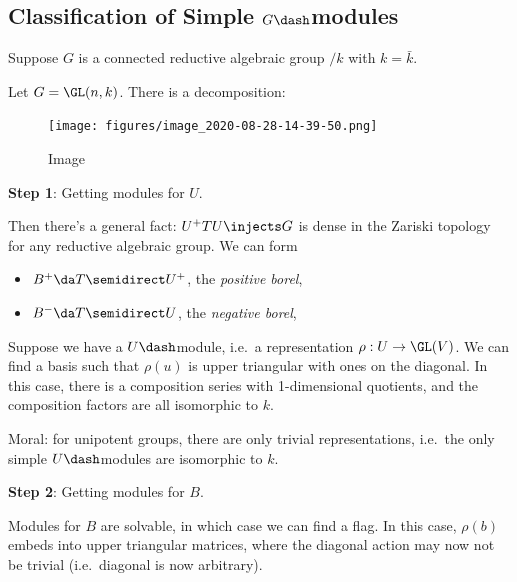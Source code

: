 
\hypertarget{classification-of-simple-gdashmodules}{%
\subsection{\texorpdfstring{Classification of Simple
\(G\dash\)modules}{Classification of Simple G\textbackslash dashmodules}}\label{classification-of-simple-gdashmodules}}

Suppose \(G\) is a connected reductive algebraic group \(/k\) with
\(k = \bar k\).

\begin{example}

Let \(G = \GL(n, k)\). There is a decomposition:

\begin{figure}
\centering
\texttt{[image: figures/image\_2020-08-28-14-39-50.png]}
\caption{Image}
\end{figure}

\end{example}

\textbf{Step 1}: Getting modules for \(U\).

Then there's a general fact: \(U^+ T U \injects G\) is dense in the
Zariski topology for any reductive algebraic group. We can form

\begin{itemize}
\tightlist
\item
  \(B^+ \da T\semidirect U^+\), the \emph{positive borel},
\item
  \(B^- \da T\semidirect U\), the \emph{negative borel},
\end{itemize}

Suppose we have a \(U\dash\)module, i.e.~a representation
\(\rho: U \to \GL(V)\). We can find a basis such that \(\rho(u)\) is
upper triangular with ones on the diagonal. In this case, there is a
composition series with 1-dimensional quotients, and the composition
factors are all isomorphic to \(k\).

Moral: for unipotent groups, there are only trivial representations,
i.e.~the only simple \(U\dash\)modules are isomorphic to \(k\).

\textbf{Step 2}: Getting modules for \(B\).

Modules for \(B\) are solvable, in which case we can find a flag. In
this case, \(\rho(b)\) embeds into upper triangular matrices, where the
diagonal action may now not be trivial (i.e.~diagonal is now arbitrary).

